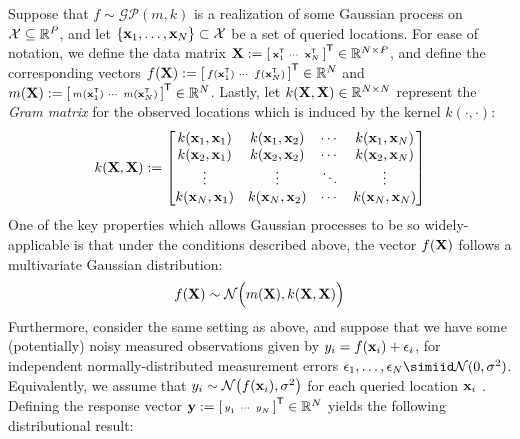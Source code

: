 \documentclass[10pt]{article}
\newcommand{\calGP}{\mathcal{GP}}
\begin{document}
Suppose that $f \sim \calGP(m, k)$ is a realization of some Gaussian process on $\mathcal{X} \subseteq \mathbb{R}^{P}$, and let $\{\mathbf{x}_{1}, \dots, \mathbf{x}_{N}\} \subset \mathcal{X}$ be a set of queried locations. For ease of notation, we define the data matrix $\mathbf{X} := \begin{bsmallmatrix}
    \mathbf{x}_{1}^{\scriptscriptstyle{\mathsf{T}}} &
    \cdots &
    \mathbf{x}_{N}^{\scriptscriptstyle{\mathsf{T}}}
\end{bsmallmatrix}^{\scriptstyle{\mathsf{T}}} \in \mathbb{R}^{N \times P}$, and define the corresponding vectors $f(\mathbf{X}) := \begin{bsmallmatrix}
    f(\mathbf{x}_{1}^{\scriptscriptstyle{\mathsf{T}}}) &
    \cdots &
    f(\mathbf{x}_{N}^{\scriptscriptstyle{\mathsf{T}}})
\end{bsmallmatrix}^{\scriptstyle{\mathsf{T}}} \in \mathbb{R}^{N}$ and $m(\mathbf{X}) := \begin{bsmallmatrix}
    m(\mathbf{x}_{1}^{\scriptscriptstyle{\mathsf{T}}}) &
    \cdots &
    m(\mathbf{x}_{N}^{\scriptscriptstyle{\mathsf{T}}})
\end{bsmallmatrix}^{\scriptstyle{\mathsf{T}}} \in \mathbb{R}^{N}$. Lastly, let $k(\mathbf{X}, \mathbf{X}) \in \mathbb{R}^{N \times N}$ represent the \emph{Gram matrix} for the observed locations which is induced by the kernel $k(\cdot, \cdot)$:
\begin{equation}
\label{eq:GP-gram-matrix}
    k(\mathbf{X}, \mathbf{X}) := \begin{bmatrix}
        k(\mathbf{x}_{1}, \mathbf{x}_{1}) & k(\mathbf{x}_{1}, \mathbf{x}_{2}) & \cdots & k(\mathbf{x}_{1}, \mathbf{x}_{N})\\
        k(\mathbf{x}_{2}, \mathbf{x}_{1}) & k(\mathbf{x}_{2}, \mathbf{x}_{2}) & \cdots & k(\mathbf{x}_{2}, \mathbf{x}_{N})\\
        \vdots & \vdots & \ddots & \vdots\\
        k(\mathbf{x}_{N}, \mathbf{x}_{1}) & k(\mathbf{x}_{N}, \mathbf{x}_{2}) & \cdots & k(\mathbf{x}_{N}, \mathbf{x}_{N})
    \end{bmatrix}
\end{equation}
One of the key properties which allows Gaussian processes to be so widely-applicable is that under the conditions described above, the vector $f(\mathbf{X})$ follows a multivariate Gaussian distribution:
\begin{equation}
\label{eq:GP-fun-distribution}
    f(\mathbf{X}) \sim \mathcal{N}\Big(m(\mathbf{X}), k(\mathbf{X}, \mathbf{X})\Big)
\end{equation}
Furthermore, consider the same setting as above, and suppose that we have some (potentially) noisy measured observations given by $y_{i} = f(\mathbf{x}_{i}) + \epsilon_{i}$, for independent normally-distributed measurement errors $\epsilon_{1}, \dots, \epsilon_{N} \simiid \calN(0, \sigma^2)$. Equivalently, we assume that $y_{i} \sim \mathcal{N}\big(f(\mathbf{x}_{i}), \sigma^{2}\big)$ for each queried location $\mathbf{x}_{i}$ \citep{GPML-Book-2006}. Defining the response vector $\bfy := \begin{bsmallmatrix}
    y_{1}^{\phantom{{\scriptscriptstyle{\sfT}}}} &
    \cdots &
    y_{N}^{\phantom{{\scriptscriptstyle{\sfT}}}}
\end{bsmallmatrix}^{\sfTsmall} \in \bbR^{N}$ yields the following distributional result:
\end{document}
